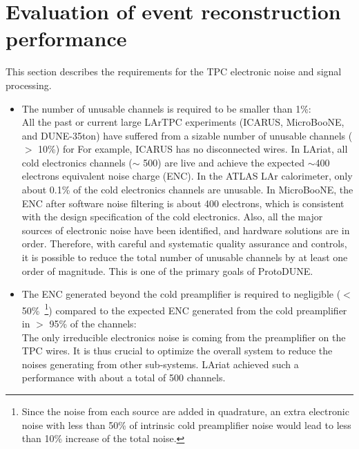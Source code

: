 \section{Evaluation of event reconstruction performance}


This section describes the requirements for the TPC electronic noise and signal processing.

\begin{itemize}
\item The number of unusable channels is required to be smaller than 1\%: \\

All the past or current large LArTPC experiments (ICARUS, MicroBooNE, and DUNE-35ton) have suffered from a sizable
number of unusable channels ($>$ 10\%) for %
For example, ICARUS has no disconnected wires. In LAriat, all cold electronics channels ($\sim$ 500) are live and achieve the expected $\sim$400 electrons equivalent noise charge (ENC). In the ATLAS LAr calorimeter, only about 0.1\% of the cold electronics channels are unusable. 
In MicroBooNE, the ENC after software noise filtering is about 400 electrons, which is consistent with the design specification of the cold electronics. Also, all the major sources of electronic noise
have been identified, and hardware solutions are in order. Therefore, with careful and systematic quality assurance and controls, it is possible to reduce the total number of unusable channels
by at least one order of magnitude. This is one of the primary goals of ProtoDUNE.


\item The ENC generated beyond the cold preamplifier is required to negligible ($<$ 50\%~\footnote{Since the noise from each source are added in quadrature, an extra electronic noise with less than 50\% of intrinsic cold preamplifier
noise would lead to less than 10\% increase of the total noise.}) compared to the 
expected ENC generated from the cold preamplifier in $>$ 95\% of the channels: \\
The only irreducible electronics noise is coming from the preamplifier on the TPC wires. It is thus
crucial to optimize the overall system to reduce the noises generating from other sub-systems. 
LAriat achieved such a performance with about a total of 500 channels. 





\end{itemize}

